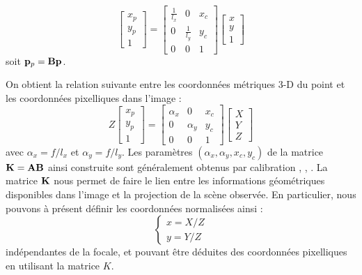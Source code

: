 \begin{equation}
\begin{bmatrix}
x_p \\y_p \\ 1
\end{bmatrix}
=
\begin{bmatrix}
\frac 1 {l_x} & 0 & x_c \\ 0 & \frac 1 {l_y} & y_c \\ 0 & 0 & 1 
\end{bmatrix}
\begin{bmatrix}
x \\ y \\ 1
\end{bmatrix}
\label{intro:eq15}
\end{equation}
soit ${\bf p}_p = {\bf B} {\bf p}$.

On obtient la relation suivante entre les coordonnées métriques 3-D du point et 
les coordonnées pixelliques dans l'image :
\begin{equation}
Z\begin{bmatrix}
x_p \\y_p \\ 1
\end{bmatrix}
=
\begin{bmatrix}
\alpha_x & 0 & x_c \\ 0 & \alpha_y & y_c \\ 0 & 0 & 1 
\end{bmatrix}
\begin{bmatrix}
X \\ Y \\ Z
\end{bmatrix}
\label{intro:eq16}
\end{equation}
avec $\alpha_x = f/l_x$ et $\alpha_y = f/l_y$. Les paramètres $(\alpha_x, 
\alpha_y, x_c, y_c)$ de la matrice ${\bf K} = {\bf A}{\bf B}$ ainsi construite 
sont généralement obtenus par calibration \cite{brown71}, \cite{tsai1986}, 
\cite{stein1997}. La matrice ${\bf K}$ nous permet de faire le lien entre les 
informations géométriques disponibles dans l'image et la projection de la scène 
observée. En particulier, nous pouvons à présent définir les 
coordonnées normalisées ainsi :
\begin{equation}
\left \lbrace
\begin{matrix}
x = X/Z \\
y = Y/Z
\end{matrix} \right .
\label{intro:eq17}
\end{equation}
indépendantes de la focale, et pouvant être déduites des coordonnées pixelliques 
en utilisant la matrice $K$.

